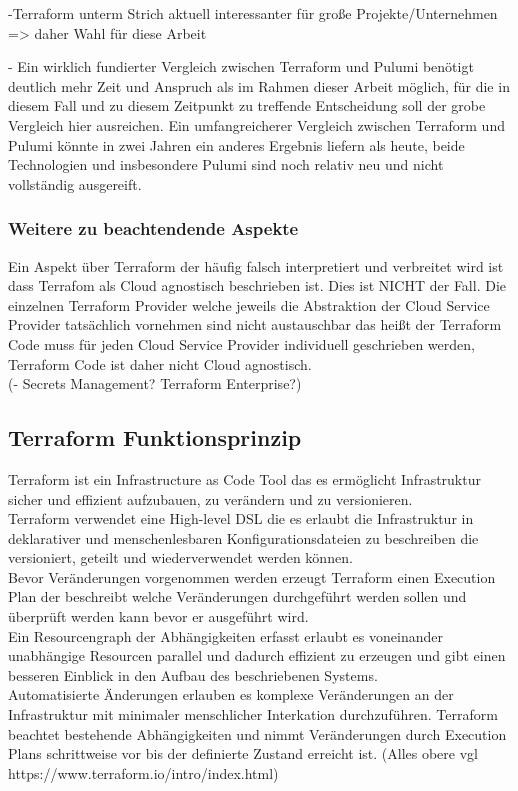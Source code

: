 -Terraform unterm Strich aktuell interessanter für große Projekte/Unternehmen
=> daher Wahl für diese Arbeit

- Ein wirklich fundierter Vergleich zwischen Terraform und Pulumi benötigt
deutlich mehr Zeit und Anspruch als im Rahmen dieser Arbeit möglich, für
die in diesem Fall und zu diesem Zeitpunkt zu treffende Entscheidung soll
der grobe Vergleich hier ausreichen. Ein umfangreicherer Vergleich zwischen
Terraform und Pulumi könnte in zwei Jahren ein anderes Ergebnis liefern
als heute, beide Technologien und insbesondere Pulumi sind noch relativ neu
und nicht vollständig ausgereift.

\subsubsection{Weitere zu beachtendende Aspekte}

Ein Aspekt über Terraform der häufig falsch interpretiert und verbreitet wird
ist dass Terrafom als Cloud agnostisch beschrieben ist. Dies ist NICHT der
Fall. Die einzelnen Terraform Provider welche jeweils die Abstraktion der
Cloud Service Provider tatsächlich vornehmen sind nicht austauschbar das heißt
der Terraform Code muss für jeden Cloud Service Provider individuell
geschrieben werden, Terraform Code ist daher nicht Cloud agnostisch.\\

(- Secrets Management? Terraform Enterprise?)

\subsection{Terraform Funktionsprinzip}

Terraform ist ein Infrastructure as Code Tool das es ermöglicht Infrastruktur
sicher und effizient aufzubauen, zu verändern und zu versionieren.\\
Terraform verwendet eine High-level DSL die es erlaubt die Infrastruktur in
deklarativer und menschenlesbaren Konfigurationsdateien zu beschreiben die
versioniert, geteilt und wiederverwendet werden können.\\
Bevor Veränderungen vorgenommen werden erzeugt Terraform einen Execution
Plan der beschreibt welche Veränderungen durchgeführt werden sollen und
überprüft werden kann bevor er ausgeführt wird.\\
Ein Resourcengraph der Abhängigkeiten erfasst erlaubt es voneinander
unabhängige Resourcen parallel und dadurch effizient zu erzeugen und gibt
einen besseren Einblick in den Aufbau des beschriebenen Systems.\\
Automatisierte Änderungen erlauben es komplexe Veränderungen an der
Infrastruktur mit minimaler menschlicher Interkation durchzuführen.
Terraform beachtet bestehende Abhängigkeiten und nimmt Veränderungen
durch Execution Plans schrittweise vor bis der definierte Zustand erreicht
ist. (Alles obere vgl https://www.terraform.io/intro/index.html)

